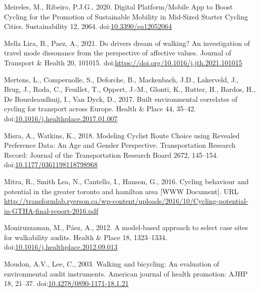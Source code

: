 \documentclass[]{elsarticle} %
\begin{document}
\leavevmode\hypertarget{ref-meirelesDigitalPlatformMobile2020}{}%
Meireles, M., Ribeiro, P.J.G., 2020. Digital Platform/Mobile App to
Boost Cycling for the Promotion of Sustainable Mobility in Mid-Sized
Starter Cycling Cities. Sustainability 12, 2064.
doi:\href{https://doi.org/10.3390/su12052064}{10.3390/su12052064}

\leavevmode\hypertarget{ref-mellaDoDrivers2021}{}%
Mella Lira, B., Paez, A., 2021. Do drivers dream of walking? An
investigation of travel mode dissonance from the perspective of
affective values. Journal of Transport \& Health 20, 101015.
doi:\href{https://doi.org/https://doi.org/10.1016/j.jth.2021.101015}{https://doi.org/10.1016/j.jth.2021.101015}

\leavevmode\hypertarget{ref-mertensBuiltEnvironmentalCorrelates2017}{}%
Mertens, L., Compernolle, S., Deforche, B., Mackenbach, J.D., Lakerveld,
J., Brug, J., Roda, C., Feuillet, T., Oppert, J.-M., Glonti, K., Rutter,
H., Bardos, H., De Bourdeaudhuij, I., Van Dyck, D., 2017. Built
environmental correlates of cycling for transport across Europe. Health
\& Place 44, 35--42.
doi:\href{https://doi.org/10.1016/j.healthplace.2017.01.007}{10.1016/j.healthplace.2017.01.007}

\leavevmode\hypertarget{ref-misraModelingCyclistRoute2018}{}%
Misra, A., Watkins, K., 2018. Modeling Cyclist Route Choice using
Revealed Preference Data: An Age and Gender Perspective. Transportation
Research Record: Journal of the Transportation Research Board 2672,
145--154.
doi:\href{https://doi.org/10.1177/0361198118798968}{10.1177/0361198118798968}

\leavevmode\hypertarget{ref-Mitra2016}{}%
Mitra, R., Smith Lea, N., Cantello, I., Hanson, G., 2016. Cycling
behaviour and potential in the greater toronto and hamilton area {[}WWW
Document{]}. URL
\url{http://transformlab.ryerson.ca/wp-content/uploads/2016/10/Cycling-potential-in-GTHA-final-report-2016.pdf}

\leavevmode\hypertarget{ref-moniruzzamanModelbasedApproachSelect2012}{}%
Moniruzzaman, M., Páez, A., 2012. A model-based approach to select case
sites for walkability audits. Health \& Place 18, 1323--1334.
doi:\href{https://doi.org/10.1016/j.healthplace.2012.09.013}{10.1016/j.healthplace.2012.09.013}

\leavevmode\hypertarget{ref-moudonWalkingBicyclingEvaluation2003}{}%
Moudon, A.V., Lee, C., 2003. Walking and bicycling: An evaluation of
environmental audit instruments. American journal of health promotion:
AJHP 18, 21--37.
doi:\href{https://doi.org/10.4278/0890-1171-18.1.21}{10.4278/0890-1171-18.1.21}
\end{document}
